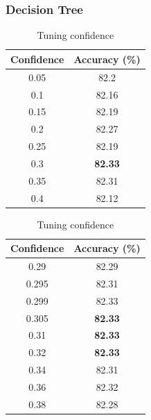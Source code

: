 \documentclass[12pt]{article}
\begin{document}
    \subsubsection{Decision Tree}
      \begin{table}[H]
        \begin{subtable}{0.5\linewidth}
          \centering
          \caption{}
            \begin{tabular}{c|c}
            \toprule
            \multicolumn{1}{l|}{Confidence} & \multicolumn{1}{l}{Accuracy (\%)} \\
            \midrule
            0.05  & 82.2 \\
            0.1   & 82.16 \\
            0.15  & 82.19 \\
            0.2   & 82.27 \\
            0.25  & 82.19 \\
            0.3   & \textbf{82.33} \\
            0.35  & 82.31 \\
            0.4   & 82.12 \\
            \bottomrule
            \end{tabular}%
        \end{subtable}
        \begin{subtable}{0.5\linewidth}
          \centering
          \caption{}
            \begin{tabular}{c|c}
            \toprule
            Confidence & Accuracy (\%)\\
            \midrule
            0.29  & 82.29 \\
            0.295 & 82.31 \\
            0.299 & 82.33 \\
            0.305 & \textbf{82.33} \\
            0.31  & \textbf{82.33} \\
            0.32  & \textbf{82.33} \\
            0.34  & 82.31 \\
            0.36  & 82.32 \\
            0.38  & 82.28 \\
            \bottomrule
            \end{tabular}%
          \label{tab:dt-2}%
        \end{subtable}
        \caption{Tuning confidence}
        \label{tab:dt-1}%
      \end{table}%
\end{document}
